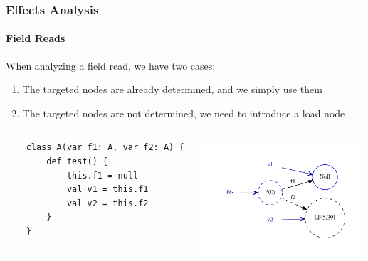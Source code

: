 \documentclass[hyperref={pdfpagelabels=false}]{beamer}
\begin{document}
\begin{frame}[fragile]
    \frametitle{Effects Analysis}
    \framesubtitle{Field Reads}
    When analyzing a field read, we have two cases:
    \begin{enumerate}
        \item The targeted nodes are already determined, and we simply use them
        \item The targeted nodes are not determined, we need to introduce a
        load node
    \end{enumerate}
    \begin{columns}
      \begin{column}{0.4\textwidth}
\begin{lstlisting}
    class A(var f1: A, var f2: A) {
        def test() {
            this.f1 = null
            val v1 = this.f1
            val v2 = this.f2
        }
    }
\end{lstlisting}
      \end{column}
      \begin{column}{0.6\textwidth}
        \includegraphics[width=60mm]{images/reads.pdf}
      \end{column}
    \end{columns}
\end{frame}
\end{document}
